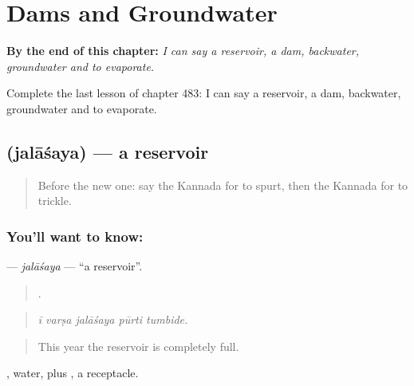 
\chapter{Dams and Groundwater}
\label{ch:ka-dams-and-groundwater}

\begin{chapteropening}
\textbf{By the end of this chapter:} \emph{I can say a reservoir, a dam, backwater, groundwater and to evaporate.}

Complete the last lesson of chapter 483: I can say a reservoir, a dam, backwater, groundwater and to evaporate.
\end{chapteropening}

\section[\texorpdfstring{\kn{ಜಲಾಶಯ} (jalāśaya)}{ಜಲಾಶಯ (jalāśaya)}]{ (jalāśaya) — a reservoir}

\label{lesson:KA-C483-jalasaya}



\begin{quote}
Before the new one: say the Kannada for to spurt, then the Kannada for to trickle.
\end{quote}

\subsection*{You'll want to know: }
\textbf{} — \emph{jalāśaya} — \textquotedblleft{}a reservoir\textquotedblright{}.

\begin{quote}
    .
\end{quote}

\begin{quote}
\emph{ī varṣa jalāśaya pūrti tumbide.}
\end{quote}

\begin{quote}
This year the reservoir is completely full.
\end{quote}

, water, plus , a receptacle.

